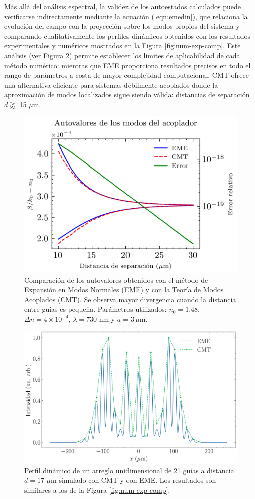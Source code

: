 Más allá del análisis espectral, la validez de los autoestados calculados puede verificarse indirectamente mediante la ecuación (\ref{eqn:emedin}), que relaciona la evolución del campo con la proyección sobre los modos propios del sistema y comparando cualitativamente los perfiles dinámicos obtenidos con los resultados experimentales y numéricos mostrados en la Figura \ref{fig:num-exp-comp}. Este análisis (ver Figura \ref{fig:1darraycmt}) permite establecer los límites de aplicabilidad de cada método numérico: mientras que EME proporciona resultados precisos en todo el rango de parámetros a costa de mayor complejidad computacional, CMT ofrece una alternativa eficiente para sistemas débilmente acoplados donde la aproximación de modos localizados sigue siendo válida: distancias de separación $d \gtrapprox$ 15 $\mu$m.
\begin{figure}[h]
    \centering
    \includegraphics[width=0.8\linewidth]{codigo/dimol/coupler.png}
    \caption[Comparación entre EME y CMT.]{Comparación de los autovalores obtenidos con el método de Expansión en Modos Normales (EME) y con la Teoría de Modos Acoplados (CMT). Se observa mayor divergencia cuando la distancia entre guías es pequeña. Parámetros utilizados: $n_0=1.48$, $\Delta n = 4\times10^{-4}$, $\lambda = 730$ nm y $a = 3\,\mu$m.}
    \label{fig:EMECMT}
\end{figure}
\begin{figure}[h]
	\centering
	\includegraphics[width=0.8\linewidth]{codigo/1darraycmt/1darraycmt.png}
	\caption[Dinámica con EME y CMT.]{Perfil dinámico de un arreglo unidimensional de 21 guías a distancia $d=17$ $\mu$m simulado con CMT y con EME. Los resultados son similares a los de la Figura \ref{fig:num-exp-comp}.}
	\label{fig:1darraycmt}
\end{figure}
